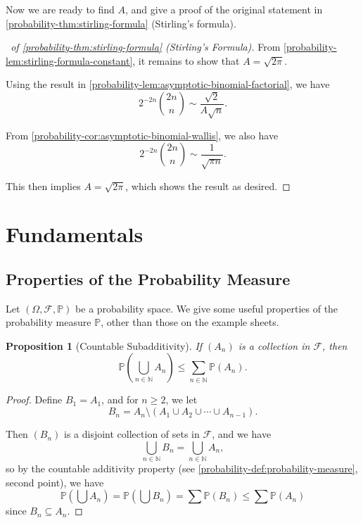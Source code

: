\documentclass[11pt]{article}
\numberwithin{equation}{section}
\newtheorem{proposition}[theorem]{Proposition}
\theoremstyle{definition}
\theoremstyle{remark}
\newcommand{\pqty}[1]{\left(#1\right)}
\newcommand{\NN}{\mathbb N}
\newcommand{\eventSpace}{\mathcal F}
\newcommand{\Prob}{\mathbb P}
\begin{document}
Now we are ready to find \(A\), and give a proof of the original statement in \autoref{probability-thm:stirling-formula} (Stirling's formula).

\begin{proof}[\proofname\ of \autoref{probability-thm:stirling-formula} (Stirling's Formula)]\label{probability-proof-007}
    From \autoref{probability-lem:stirling-formula-constant}, it remains to show that \(A = \sqrt{2 \pi}\).
    
    Using the result in \autoref{probability-lem:asymptotic-binomial-factorial}, we have
    \[
        2^{-2n} \binom{2n}{n} \sim \frac{\sqrt{2}}{A \sqrt{n}}.
    \]

    From \autoref{probability-cor:asymptotic-binomial-wallis}, we also have
    \[
        2^{-2n} \binom{2n}{n} \sim \frac{1}{\sqrt{\pi n}}.
    \]
    
    This then implies \(A = \sqrt{2 \pi}\), which shows the result as desired.
\end{proof}



\section{Fundamentals}\label{probability-section-03}

\subsection{Properties of the Probability Measure}

Let \(\pqty{\Omega, \eventSpace, \Prob}\) be a probability space. We give some useful properties of the probability measure \(\Prob\), other than those on the example sheets.

\begin{proposition}[Countable Subadditivity]\label{probability-proposition-002}
    \label{probability-prop:countable-subadditivity}%
    If \(\pqty{A_n}\) is a collection in \(\eventSpace\), then
    \[
        \Prob\pqty{\bigcup_{n \in \NN} A_n} \leq \sum_{n \in \NN} \Prob\pqty{A_n}.
    \]
\end{proposition}

\begin{proof}\label{probability-proof-008}
    Define \(B_1 = A_1\), and for \(n \geq 2\), we let
    \[
        B_n = A_n \setminus \pqty{A_1 \cup A_2 \cup \cdots \cup A_{n - 1}}.
    \]

    Then \(\pqty{B_n}\) is a disjoint collection of sets in \(\eventSpace\), and we have
    \[
        \bigcup_{n \in \NN} B_n = \bigcup_{n \in \NN} A_n,
    \]
    so by the countable additivity property (see \autoref{probability-def:probability-measure}, second point), we have
    \[
        \Prob\pqty{\bigcup A_n} = \Prob\pqty{\bigcup B_n} = \sum \Prob\pqty{B_n} \leq \sum \Prob\pqty{A_n}
    \]
    since \(B_n \subseteq A_n\).
\end{proof}
\end{document}

